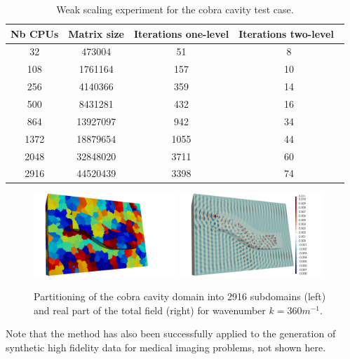 \begin{table}[H]
    \scriptsize
\begin{center}
\begin{tabular}{cccc}
Nb CPUs & Matrix size & Iterations one-level & Iterations two-level~\cite{nataf:hal-04536547} \\
\hline
32 & 473004   & 51   &  8 \\
108 & 1761164  & 157  & 10 \\
256 & 4140366  & 359  & 14 \\
500 & 8431281  & 432  & 16 \\
864 & 13927097 & 942  & 34 \\
1372 & 18879654 & 1055 & 44 \\
2048 & 32848020 & 3711 & 60 \\
2916 & 44520439 & 3398 & 74 \\
\end{tabular}
\end{center}
    \caption{
		Weak scaling experiment for the cobra cavity test case.
    }\label{tab:weak_scaling_cobra}
\end{table}
\begin{figure}[H]
    \centering
	{\includegraphics[width=0.48\textwidth,clip=true,trim=7cm 0cm 7cm 0cm]{./graphics/wp3/cobra_mesh_2.png}}
	{\includegraphics[width=0.48\textwidth,clip=true,trim=7cm 0cm 7cm 0cm]{./graphics/wp3/cobra_real.png}}
	\caption{
		Partitioning of the cobra cavity domain into 2916 subdomains (left) and real part of the total field (right) for wavenumber $k = 360m^{-1}$. 
    }\label{fig:solutions_cobra}
\end{figure}
Note that the method has also been successfully applied to the generation of synthetic high fidelity data for medical imaging problems, not shown here. 


